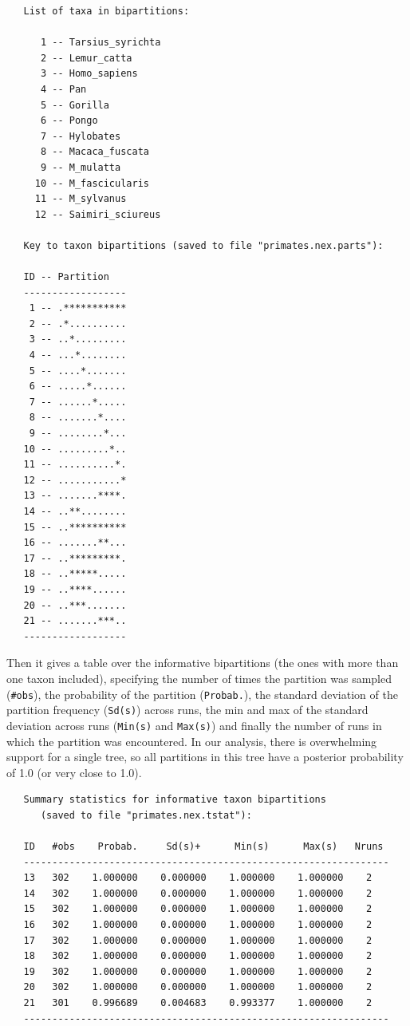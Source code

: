 \documentclass[12pt]{book}
\begin{document}
\begin{singlespacing}
\small
\begin{verbatim}
   List of taxa in bipartitions:                                                 
                                                                                   
      1 -- Tarsius_syrichta
      2 -- Lemur_catta
      3 -- Homo_sapiens
      4 -- Pan
      5 -- Gorilla
      6 -- Pongo
      7 -- Hylobates
      8 -- Macaca_fuscata
      9 -- M_mulatta
     10 -- M_fascicularis
     11 -- M_sylvanus
     12 -- Saimiri_sciureus

   Key to taxon bipartitions (saved to file "primates.nex.parts"):

   ID -- Partition
   ------------------
    1 -- .***********
    2 -- .*..........
    3 -- ..*.........
    4 -- ...*........
    5 -- ....*.......
    6 -- .....*......
    7 -- ......*.....
    8 -- .......*....
    9 -- ........*...
   10 -- .........*..
   11 -- ..........*.
   12 -- ...........*
   13 -- .......****.
   14 -- ..**........
   15 -- ..**********
   16 -- .......**...
   17 -- ..*********.
   18 -- ..*****.....
   19 -- ..****......
   20 -- ..***.......
   21 -- .......***..
   ------------------
\end{verbatim}
\normalsize
\end{singlespacing}

Then it gives a table over the informative bipartitions (the ones with more than one taxon included), 
specifying the number of times the partition was sampled (\texttt{\#obs}), the probability of the partition 
(\texttt{Probab.}), the standard deviation of the partition frequency (\texttt{Sd(s)}) across runs, the min 
and max of the standard deviation across runs (\texttt{Min(s)} and \texttt{Max(s)}) and finally the number 
of runs in which the partition was encountered. In our analysis, there is overwhelming support for a single 
tree, so all partitions in this tree have a posterior probability of 1.0 (or very close to 1.0).

\begin{singlespacing}
\small
\begin{verbatim}
   Summary statistics for informative taxon bipartitions
      (saved to file "primates.nex.tstat"):

   ID   #obs    Probab.     Sd(s)+      Min(s)      Max(s)   Nruns 
   ----------------------------------------------------------------
   13   302    1.000000    0.000000    1.000000    1.000000    2
   14   302    1.000000    0.000000    1.000000    1.000000    2
   15   302    1.000000    0.000000    1.000000    1.000000    2
   16   302    1.000000    0.000000    1.000000    1.000000    2
   17   302    1.000000    0.000000    1.000000    1.000000    2
   18   302    1.000000    0.000000    1.000000    1.000000    2
   19   302    1.000000    0.000000    1.000000    1.000000    2
   20   302    1.000000    0.000000    1.000000    1.000000    2
   21   301    0.996689    0.004683    0.993377    1.000000    2
   ----------------------------------------------------------------
\end{verbatim}
\normalsize
\end{singlespacing}
\end{document}

